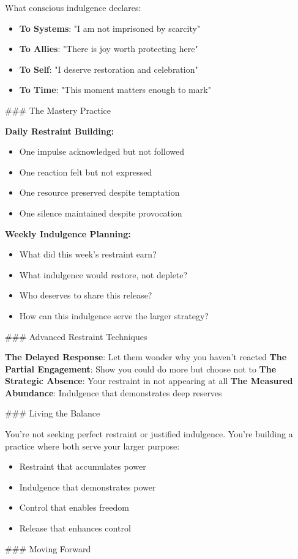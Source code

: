 \documentclass[12pt]{book}
\begin{document}
What conscious indulgence declares:

\begin{itemize}
\item \textbf{To Systems}: "I am not imprisoned by scarcity"
\item \textbf{To Allies}: "There is joy worth protecting here"
\item \textbf{To Self}: "I deserve restoration and celebration"
\item \textbf{To Time}: "This moment matters enough to mark"

\end{itemize}
\#\#\# The Mastery Practice

\textbf{Daily Restraint Building:}
\begin{itemize}
\item One impulse acknowledged but not followed
\item One reaction felt but not expressed
\item One resource preserved despite temptation
\item One silence maintained despite provocation

\end{itemize}
\textbf{Weekly Indulgence Planning:}
\begin{itemize}
\item What did this week's restraint earn?
\item What indulgence would restore, not deplete?
\item Who deserves to share this release?
\item How can this indulgence serve the larger strategy?

\end{itemize}
\#\#\# Advanced Restraint Techniques

\textbf{The Delayed Response}: Let them wonder why you haven't reacted
\textbf{The Partial Engagement}: Show you could do more but choose not to
\textbf{The Strategic Absence}: Your restraint in not appearing at all
\textbf{The Measured Abundance}: Indulgence that demonstrates deep reserves

\#\#\# Living the Balance

You're not seeking perfect restraint or justified indulgence. You're building a practice where both serve your larger purpose:

\begin{itemize}
\item Restraint that accumulates power
\item Indulgence that demonstrates power
\item Control that enables freedom
\item Release that enhances control

\end{itemize}
\#\#\# Moving Forward
\end{document}
